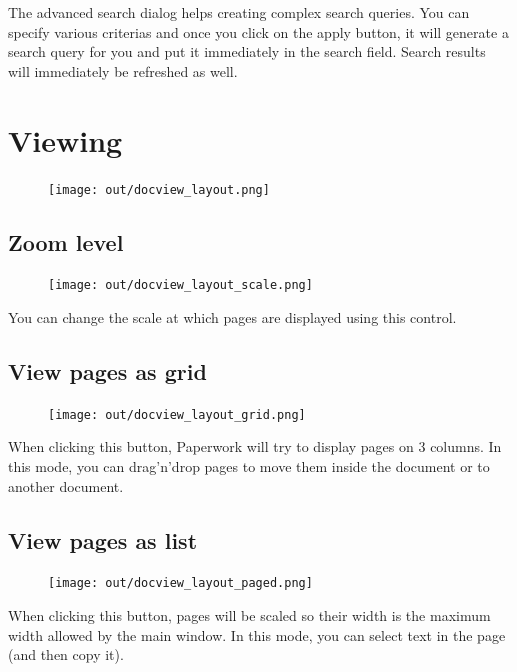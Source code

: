 \documentclass[10pt,a4paper]{article}
\begin{document}
The advanced search dialog helps creating complex search queries. You can
specify various criterias and once you click on the apply button, it will
generate a search query for you and put it immediately in the search field.
Search results will immediately be refreshed as well.


\section{Viewing}

\begin{figure}[H]
	\texttt{[image: out/docview\_layout.png]}
\end{figure}

\subsection{Zoom level}

\begin{figure}[H]
	\texttt{[image: out/docview\_layout\_scale.png]}
\end{figure}

You can change the scale at which pages are displayed using this control.

\subsection{View pages as grid}
\label{layout:grid}

\begin{figure}[H]
	\texttt{[image: out/docview\_layout\_grid.png]}
\end{figure}

When clicking this button, Paperwork will try to display pages on 3 columns.
In this mode, you can drag'n'drop pages to move them inside the document
or to another document.

\subsection{View pages as list}
\label{layout:paged}

\begin{figure}[H]
	\texttt{[image: out/docview\_layout\_paged.png]}
\end{figure}

When clicking this button, pages will be scaled so their width is the maximum
width allowed by the main window. In this mode, you can select text in the
page (and then copy it).
\end{document}
